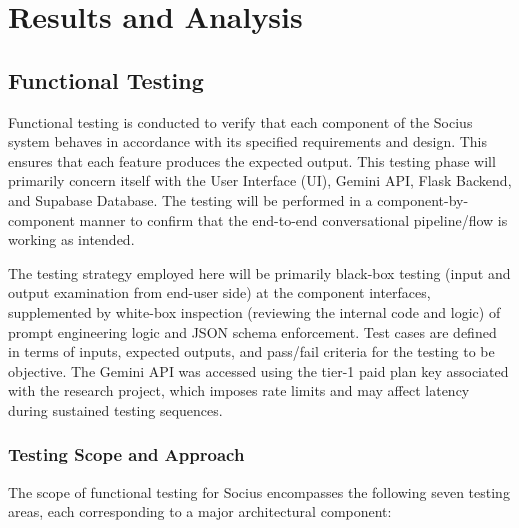
\chapter{Results and Analysis}\label{chap:chapter6}

\section{Functional Testing}
  Functional testing is conducted to verify that each component of the Socius system behaves in accordance with its specified requirements and design.
This ensures that each feature produces the expected output. This testing phase will primarily concern itself with the User Interface (UI), Gemini API, Flask Backend,
and Supabase Database. The testing will be performed in a component-by-component manner to confirm that the end-to-end conversational pipeline/flow is working as intended.
 
  The testing strategy employed here will be primarily black-box testing (input and output examination from end-user side) at the component interfaces, supplemented by white-box 
inspection (reviewing the internal code and logic) of prompt engineering logic and JSON schema 
enforcement. Test cases are defined in terms of inputs, expected outputs, and pass/fail criteria for the testing to be objective. The Gemini API was accessed using the tier-1 paid plan
key associated with the research project, which imposes rate limits and may affect latency during sustained testing sequences.
 
\subsection{Testing Scope and Approach}
The scope of functional testing for Socius encompasses the following seven testing areas, each corresponding to a major architectural component:
 
